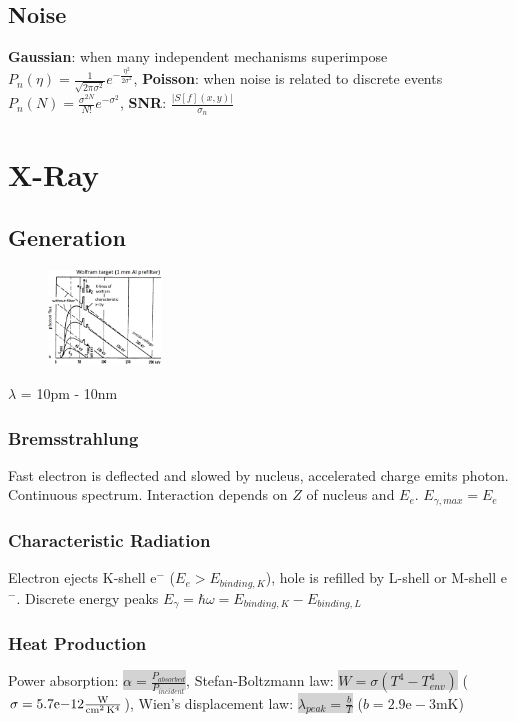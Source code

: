 \documentclass[9pt]{article}
\newcommand{\grey}[1]{\setlength{\fboxsep}{0pt}\colorbox{lightgrey}{#1}}
\begin{document}
\begin{multicols}{2}
\subsection{Noise}
\textbf{Gaussian}: when many independent mechanisms superimpose $P_n(\eta)=\frac{1}{\sqrt{2\pi \sigma^2}}e^{-\frac{\eta ^2}{2\sigma ^2}}$, \textbf{Poisson}: when noise is related to discrete events $P_n(N)=\frac{\sigma ^{2N}}{N!}e^{-\sigma ^2}$, \textbf{SNR}: $\frac{|S[f](x,y)|}{\sigma_n}$
\section{X-Ray}
\subsection{Generation}
\begin{figure}
	\includegraphics[width=3cm]{xrayspec.PNG}
\end{figure}
\vspace{-5mm}
$\lambda$ = 10pm - 10nm
\subsubsection{Bremsstrahlung}
Fast electron is deflected and slowed by nucleus, accelerated charge emits photon. Continuous spectrum. Interaction depends on $Z$ of nucleus and $E_e$. $E_{\gamma,max} = E_e$
\subsubsection{Characteristic Radiation}
Electron ejects K-shell e${}^-$ ($E_e > E_{binding,K}$), hole is refilled by L-shell or M-shell e${}^-$. Discrete energy peaks $E_\gamma = \hbar \omega = E_{binding,K}-E_{binding,L}$

\subsubsection{Heat Production}
Power absorption: \grey{$\alpha = \frac{P_{absorbed}}{P_{incident}}$}, Stefan-Boltzmann law: \grey{$W = \sigma(T^4 - T^4_{env})$} ($\sigma = 5.7\mathrm{e-}12 \mathrm{W\over cm^2\,K^4}$), Wien's displacement law: \grey{$\lambda_{peak} = \frac{b}{T}$} ($b=2.9\mathrm{e-}3$mK)


\end{multicols}
\end{document}
